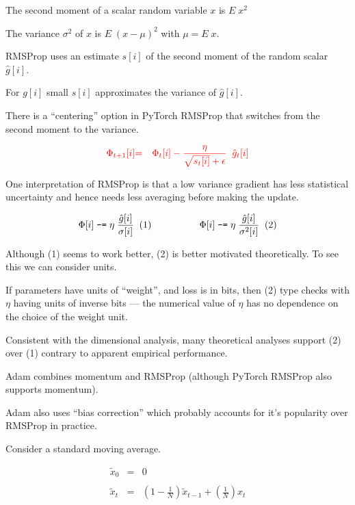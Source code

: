 {
The second moment of a scalar random variable $x$ is $E\;x^2$

\vfill
The variance $\sigma^2$ of $x$ is $E \;(x - \mu)^2$ with $\mu = E\;x$.

\vfill
RMSProp uses an estimate $s[i]$ of the second moment of the random scalar $\hat{g}[i]$.

\vfill
For $g[i]$ small $s[i]$ approximates the variance of $\hat{g}[i]$.

\vfill
There is a ``centering'' option in PyTorch RMSProp that switches from the second moment to the variance.

\begin{eqnarray*}
{\color{red} \Phi_{t+1}[i]} & {\color{red} =} & {\color{red} \Phi_t[i] - \frac{\eta}{\sqrt{s_t[i]} + \epsilon}\;\; \hat{g}_t[i]}
\end{eqnarray*}

\vfill
One interpretation of RMSProp is that a low variance gradient has less statistical uncertainty and hence needs less averaging before making the update.


{\color{red} $$\Phi[i] \;\mbox{\tt -=} \; \eta\;\frac{\hat{g}[i]}{\sigma[i]}\;\;(1)\hspace{5em}\Phi[i] \;\mbox{\tt -=} \; \eta\;\frac{\hat{g}[i]}{\sigma^2[i]}\;\;(2)$$}

\vfill
Although (1) seems to work better, (2) is better motivated theoretically.  To see this we can consider units.

\vfill
If parameters have units of ``weight'', and loss is in bits, then (2) type checks with $\eta$ having units of inverse bits --- the numerical value of $\eta$
has no dependence on the choice of the weight unit.

\vfill
Consistent with the dimensional analysis, many theoretical analyses support (2) over (1) contrary to apparent empirical performance.

Adam combines momentum and RMSProp (although PyTorch RMSProp also supports momentum).

\vfill
Adam also uses ``bias correction'' which probably accounts for it's popularity over RMSProp in practice.


Consider a standard moving average.

\begin{eqnarray*}
\tilde{x}_0 & = & 0 \\
\\
\tilde{x}_t & = & \left(1-\frac{1}{N}\right)\tilde{x}_{t-1} + \left(\frac{1}{N}\right)x_t
\end{eqnarray*}

}
